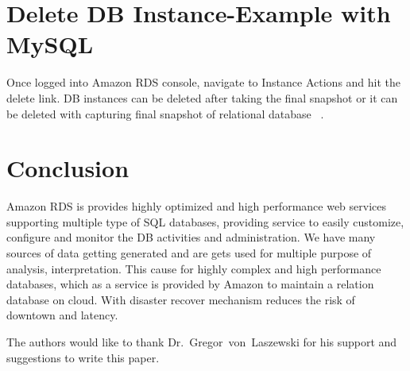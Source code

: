 \section{Delete DB Instance-Example with MySQL}

Once logged into Amazon RDS console, navigate to Instance Actions 
and hit the delete link.
DB instances can be deleted after taking the final snapshot or it can be 
deleted with capturing final snapshot of relational database
~\cite{hid-sp18-520-amazonrdscreatesteps}.

\section{Conclusion}
Amazon RDS is provides highly optimized and high performance web services
supporting multiple type of SQL databases, providing service to easily 
customize, configure and monitor the DB activities and administration.
We have many sources of data getting generated and are gets used for 
multiple purpose of analysis, interpretation. This cause for highly complex
and high performance databases, which as a service is provided by Amazon to 
maintain a relation database on cloud. With disaster recover mechanism reduces
the risk of downtown and latency.

\begin{acks}
  The authors would like to thank Dr.~Gregor~von~Laszewski for his
  support and suggestions to write this paper.
\end{acks}



 
